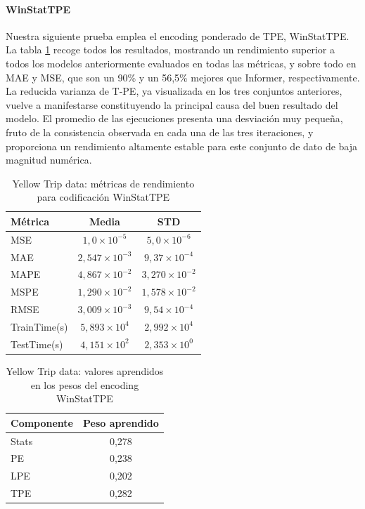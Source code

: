 \paragraph{WinStatTPE}

Nuestra siguiente prueba emplea el encoding ponderado de TPE, WinStatTPE. La tabla \ref{taxitpe} recoge todos los resultados, mostrando un rendimiento superior a todos los modelos anteriormente evaluados en todas las métricas, y sobre todo en MAE y MSE, que son un 90\% y un 56,5\% mejores que Informer, respectivamente. La reducida varianza de T-PE, ya visualizada en los tres conjuntos anteriores, vuelve a manifestarse constituyendo la principal causa del buen resultado del modelo. El promedio de las ejecuciones presenta una desviación muy pequeña, fruto de la consistencia observada en cada una de las tres iteraciones, y proporciona un rendimiento altamente estable para este conjunto de dato de baja magnitud numérica.\\

\begin{table}[!ht]
	\centering
	\begin{tabular}{l|c|c}
		\toprule
		Métrica & Media & STD \\
		\midrule
		MSE & $1,0 \times 10^{-5}$ & $5,0 \times 10^{-6}$ \\
		MAE & $2,547 \times 10^{-3}$ & $9,37 \times 10^{-4}$ \\
		MAPE & $4,867 \times 10^{-2}$ & $3,270 \times 10^{-2}$ \\
		MSPE & $1,290 \times 10^{-2}$ & $1,578 \times 10^{-2}$ \\
		RMSE & $3,009 \times 10^{-3}$ & $9,54 \times 10^{-4}$ \\
		TrainTime(s) & $5,893 \times 10^{4}$ & $2,992 \times 10^{4}$ \\
		TestTime(s) & $4,151 \times 10^{2}$ & $2,353 \times 10^{0}$ \\
		\bottomrule
	\end{tabular}
	\caption{Yellow Trip data: métricas de rendimiento para codificación WinStatTPE}
	\label{taxitpe}
\end{table}


\begin{table}[!ht]
	\centering
	\begin{tabular}{l|c}
		\toprule
		Componente & Peso aprendido \\
		\midrule
		Stats & 0,278 \\
		PE & 0,238 \\
		LPE & 0,202 \\
		TPE & 0,282 \\
		\bottomrule
	\end{tabular}
	\caption{Yellow Trip data: valores aprendidos en los pesos del encoding WinStatTPE}
	\label{taxitpepesos}
\end{table}

